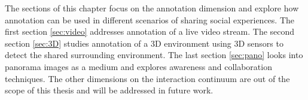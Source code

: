 The sections of this chapter focus on the annotation dimension and explore how annotation can be used in different scenarios of sharing social experiences. The first section \ref{sec:video} addresses annotation of a live video stream. The second section \ref{sec:3D} studies annotation of a 3D environment using 3D sensors to detect the shared surrounding environment. The last section \ref{sec:pano} looks into panorama images as a medium and explores awareness and collaboration techniques. The other dimensions on the interaction continuum are out of the scope of this thesis and will be addressed in future work. 





